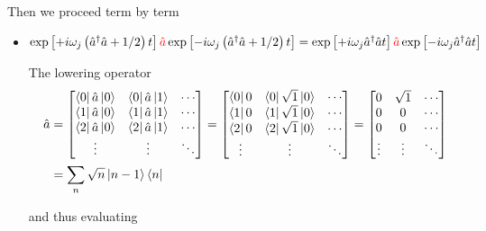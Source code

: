   \noindent Then we proceed term by term
  \begin{itemize}
  \item
    $\exp\left[+i\omega_j\left(\hat{a}^\dagger\hat{a}+{1}/{2}\right)t\right]\textcolor{red}{\hat{a}}\exp\left[-i\omega_j\left(\hat{a}^\dagger\hat{a}+{1}/{2}\right)t\right]
    =
    \exp\left[+i\omega_j\hat{a}^\dagger\hat{a}t\right]\textcolor{red}{\hat{a}}\exp\left[-i\omega_j\hat{a}^\dagger\hat{a}t\right]$
  	
    The lowering operator \textcolor{red}{
      \begin{equation}
        \begin{aligned}
          \hat{a} & =
          \begin{bmatrix}
            \bra{0}\hat{a}\ket{0} & \bra{0}\hat{a}\ket{1} & \cdots\\
            \bra{1}\hat{a}\ket{0} & \bra{1}\hat{a}\ket{1} & \cdots\\
            \bra{2}\hat{a}\ket{0} & \bra{2}\hat{a}\ket{1} & \cdots\\
            \vdots & \vdots & \ddots\\
          \end{bmatrix}
          = \begin{bmatrix}
            \bra{0}0 & \bra{0}\sqrt{1}\ket{0} & \cdots\\
            \bra{1}0 & \bra{1}\sqrt{1}\ket{0} & \cdots\\
            \bra{2}0 & \bra{2}\sqrt{1}\ket{0} & \cdots\\
            \vdots & \vdots & \ddots\\
          \end{bmatrix}
          = \begin{bmatrix}
            0 & \sqrt{1} & \cdots\\
            0 & 0 & \cdots\\
            0 & 0 & \cdots\\
            \vdots & \vdots & \ddots\\
          \end{bmatrix}\\
          & = \sum_n\sqrt{n}\ket{n-1}\bra{n}
        \end{aligned}
      \end{equation}}
  	
    \noindent and thus evaluating
  	

\end{itemize}
